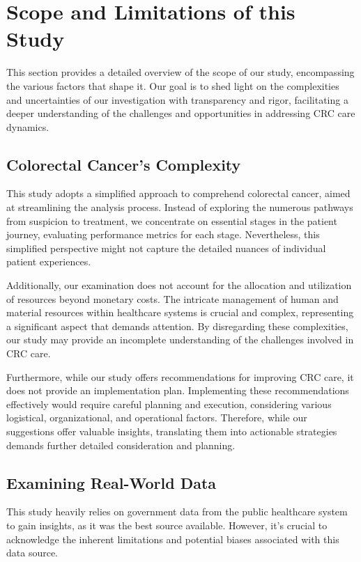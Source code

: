\section{Scope and Limitations of this Study}

This section provides a detailed overview of the scope of our study, encompassing the various factors that shape it. Our goal is to shed light on the complexities and uncertainties of our investigation with transparency and rigor, facilitating a deeper understanding of the challenges and opportunities in addressing CRC care dynamics.

\subsection*{Colorectal Cancer's Complexity}

This study adopts a simplified approach to comprehend colorectal cancer, aimed at streamlining the analysis process. Instead of exploring the numerous pathways from suspicion to treatment, we concentrate on essential stages in the patient journey, evaluating performance metrics for each stage. Nevertheless, this simplified perspective might not capture the detailed nuances of individual patient experiences.

Additionally, our examination does not account for the allocation and utilization of resources beyond monetary costs. The intricate management of human and material resources within healthcare systems is crucial and complex, representing a significant aspect that demands attention. By disregarding these complexities, our study may provide an incomplete understanding of the challenges involved in CRC care.

Furthermore, while our study offers recommendations for improving CRC care, it does not provide an implementation plan. Implementing these recommendations effectively would require careful planning and execution, considering various logistical, organizational, and operational factors. Therefore, while our suggestions offer valuable insights, translating them into actionable strategies demands further detailed consideration and planning.

\subsection*{Examining Real-World Data}

This study heavily relies on government data from the public healthcare system to gain insights, as it was the best source available. However, it's crucial to acknowledge the inherent limitations and potential biases associated with this data source. 


